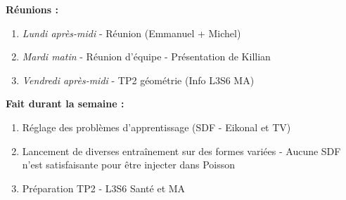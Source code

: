 \textbf{Réunions :}
\begin{enumerate}[label=\textbullet]
	\item \textit{Lundi après-midi} - Réunion (Emmanuel + Michel)
	\item \textit{Mardi matin} - Réunion d'équipe - Présentation de Killian
	\item \textit{Vendredi après-midi} - TP2 géométrie (Info L3S6 MA)
\end{enumerate}
\textbf{Fait durant la semaine :}
\begin{enumerate}[label=\textbullet]
	\item Réglage des problèmes d'apprentissage (SDF - Eikonal et TV)
	\item Lancement de diverses entraînement sur des formes variées - Aucune SDF n'est satisfaisante pour être injecter dans Poisson
	\item Préparation TP2 - L3S6 Santé et MA
\end{enumerate}